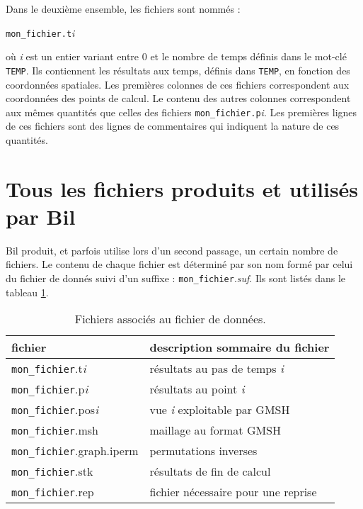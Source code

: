 \documentclass[a4paper,11pt]{article}
\begin{document}
Dans le deuxi\`eme ensemble, les fichiers sont nomm\'es :
\begin{center}
{\tt mon\_fichier.t}\textit{i}
\end{center}
o\`u \textit{i} est un entier variant entre 0 et le nombre de temps d\'efinis dans le mot-cl\'e {\tt TEMP}. Ils contiennent les r\'esultats aux temps, d\'efinis dans {\tt TEMP}, en fonction des coordonn\'ees spatiales. Les premi\`eres colonnes de ces fichiers correspondent aux coordonn\'ees des points de calcul. Le contenu des autres colonnes correspondent aux m\^emes quantit\'es que celles des fichiers {\tt mon\_fichier.p}\textit{i}. Les premi\`eres lignes de ces fichiers sont des lignes de commentaires qui indiquent la nature de ces quantit\'es.

\section{Tous les fichiers produits et utilis\'es par Bil}
Bil produit, et parfois utilise lors d'un second passage, un certain nombre de fichiers. Le contenu de chaque fichier est d\'etermin\'e par son nom form\'e par celui du fichier de donn\'es suivi d'un suffixe : {\tt mon\_fichier}.\textit{suf}. Ils sont list\'es dans le tableau \ref{tab:t6}.

\begin{table}[ht]
\begin{center}
\begin{tabular}{|l|l|}
\hline
fichier & description sommaire du fichier\\ \hline\hline
{\tt mon\_fichier}.t\textit{i} & r\'esultats au pas de temps \textit{i}\\ \hline
{\tt mon\_fichier}.p\textit{i} & r\'esultats au point \textit{i}\\ \hline
{\tt mon\_fichier}.pos\textit{i} & vue \textit{i} exploitable par GMSH\\ \hline
{\tt mon\_fichier}.msh & maillage au format GMSH\\ \hline
{\tt mon\_fichier}.graph.iperm & permutations inverses\\ \hline
{\tt mon\_fichier}.stk & r\'esultats de fin de calcul\\ \hline
{\tt mon\_fichier}.rep & fichier n\'ecessaire pour une reprise\\ \hline
\end{tabular}
\end{center}
\caption{Fichiers associ\'es au fichier de donn\'ees.}
\label{tab:t6}
\end{table}
\end{document}
